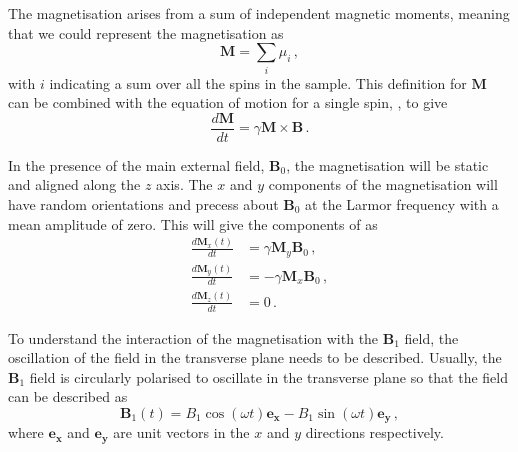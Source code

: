 The magnetisation arises from a sum of independent magnetic moments, meaning that we could represent the magnetisation as 
\begin{equation}
	\mathbf{M} = \sum_i \mu_i \,,
\end{equation}
with $i$ indicating a sum over all the spins in the sample.
This definition for $\mathbf{M}$ can be combined with the equation of motion for a single spin, , to give \cite{Haacke1999}
\begin{equation}
	\frac{d\mathbf{M}}{dt} = \gamma \mathbf{M} \times \mathbf{B}\,.
	\label{eq:dMdt}
\end{equation}  

In the presence of the main external field, $\mathbf{B}_0$, the magnetisation will be static and aligned along the $z$ axis. The $x$ and $y$ components of the magnetisation will have random orientations and precess about $\mathbf{B}_0$ at the Larmor frequency with a mean amplitude of zero. This will give the components of  as\cite{DeGraaf2007}
\begin{align}
	\frac{d\mathbf{M}_x(t)}{dt} &= \gamma\mathbf{M}_y\mathbf{B}_0\,,\\
	\frac{d\mathbf{M}_y(t)}{dt} &= -\gamma\mathbf{M}_x\mathbf{B}_0\,,\\	\frac{d\mathbf{M}_z(t)}{dt} &= 0 \,.
\end{align}

To understand the interaction of the magnetisation with the $\mathbf{B}_1$ field, the oscillation of the field in the transverse plane needs to be described. 
%
Usually, the $\mathbf{B}_1$ field is circularly polarised to oscillate in the transverse plane so that the field can be described as
\begin{equation}
	\mathbf{B}_1(t) = B_1\cos(\omega t) \mathbf{e_x} - B_1\sin(\omega t) \mathbf{e_y}\,,
	\label{eq:circB1}
\end{equation}
where $\mathbf{e_x}$ and $\mathbf{e_y}$ are unit vectors in the $x$ and $y$ directions respectively. 


